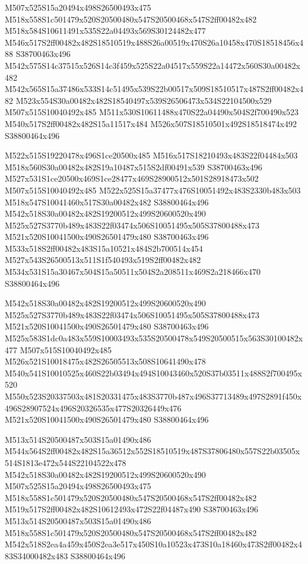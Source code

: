 \documentclass{article}
\begin{document}
\begin{multicols}{2}
M507x525S15a20494x498S26500493x475 M518x558S1c501479x520S20500480x547S20500468x547S2ff00482x482 M518x584S10611491x535S22a04493x569S30124482x477 M546x517S2ff00482x482S18510519x488S26a00519x470S26a10458x470S18518456x488 S38700463x496 M542x575S14c37515x526S14c3f459x525S22a04517x559S22a14472x560S30a00482x482 M542x565S15a37486x533S14c51495x539S22b00517x509S18510517x487S2ff00482x482 M523x554S30a00482x482S18540497x539S26506473x534S22104500x529 M507x515S10040492x485 M511x530S10611488x470S22a04490x504S2f700490x523 M540x517S2ff00482x482S15a11517x484 M526x507S18510501x492S18518474x492 S38800464x496

M522x515S19220478x496S1ce20500x485 M516x517S18210493x483S22f04484x503 M518x560S30a00482x482S19a10487x515S2df00491x539 S38700463x496 M527x531S1ce20500x469S1ce28477x469S28900512x501S28918473x502 M507x515S10040492x485 M522x525S15a37477x476S10051492x483S2330b483x503 M518x547S10041460x517S30a00482x482 S38800464x496 M542x518S30a00482x482S19200512x499S20600520x490 M525x527S3770b489x483S22f03474x506S10051495x505S37800488x473 M521x520S10041500x490S26501479x480 S38700463x496 M533x518S2ff00482x483S15a10521x484S2b700514x454 M527x543S26500513x511S1f540493x519S2ff00482x482 M534x531S15a30467x504S15a50511x504S2a208511x469S2a218466x470 S38800464x496

M542x518S30a00482x482S19200512x499S20600520x490 M525x527S3770b489x483S22f03474x506S10051495x505S37800488x473 M521x520S10041500x490S26501479x480 S38700463x496 M525x583S1dc0a483x559S10003493x535S20500478x549S20500515x563S30100482x477 M507x515S10040492x485 M526x521S10018475x482S26505513x508S10641490x478 M540x541S10010525x460S22b03494x494S10043460x520S37b03511x488S2f700495x520 M550x523S20337503x481S20331475x483S3770b487x496S37713489x497S2891f450x496S28907524x496S20326535x477S20326449x476 M521x520S10041500x490S26501479x480 S38800464x496

M513x514S20500487x503S15a01490x486 M544x564S2ff00482x482S15a36512x552S18510519x487S37806480x557S22b03505x514S1813e472x544S22104522x478 M542x518S30a00482x482S19200512x499S20600520x490 M507x525S15a20494x498S26500493x475 M518x558S1c501479x520S20500480x547S20500468x547S2ff00482x482 M519x517S2ff00482x482S10612493x472S22f04487x490 S38700463x496 M513x514S20500487x503S15a01490x486 M518x558S1c501479x520S20500480x547S20500468x547S2ff00482x482 M542x518S2ea4a459x450S2ea3e517x450S10a10523x473S10a18460x473S2ff00482x483S34000482x483 S38800464x496


\end{multicols}
\end{document}
